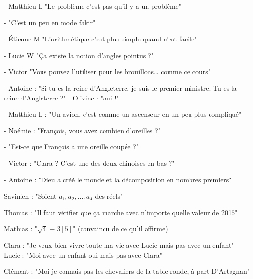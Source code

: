 \noindent - Matthieu L "Le problème c'est pas qu'il y a un problème"

\noindent - "C'est un peu en mode fakir"

\noindent - Étienne M "L'arithmétique c'est plus simple quand c'est facile"

\noindent - Lucie W "Ça existe la notion d'angles pointus ?"

\noindent - Victor "Vous pouvez l'utiliser pour les brouillons… comme ce cours"

\noindent - Antoine : "Si tu es la reine d'Angleterre, je suis le premier ministre. Tu es la reine d'Angleterre ?"
\noindent - Olivine : "oui !"

\noindent - Matthieu L : "Un avion, c'est comme un ascenseur en un peu plus compliqué"

\noindent - Noémie : "François, vous avez combien d'oreilles ?"

\noindent - "Est-ce que François a une oreille coupée ?"

\noindent - Victor : "Clara ? C'est une des deux chinoises en bas ?"

\noindent - Antoine : "Dieu a créé le monde et la décomposition en nombres premiers"

\noindent Savinien : "Soient $a_1, a_2, \ldots, a_4$ des réels"

\noindent Thomas : "Il faut vérifier que ça marche avec n'importe quelle valeur de 2016"

\noindent Mathias : "$\sqrt{4} \equiv 3 [5]$" (convaincu de ce qu'il affirme)

\noindent Clara : "Je veux bien vivre toute ma vie avec Lucie mais pas avec un enfant"
\noindent Lucie : "Moi avec un enfant oui mais pas avec Clara"

\noindent Clément : "Moi je connais pas les chevaliers de la table ronde, à part D'Artagnan"

